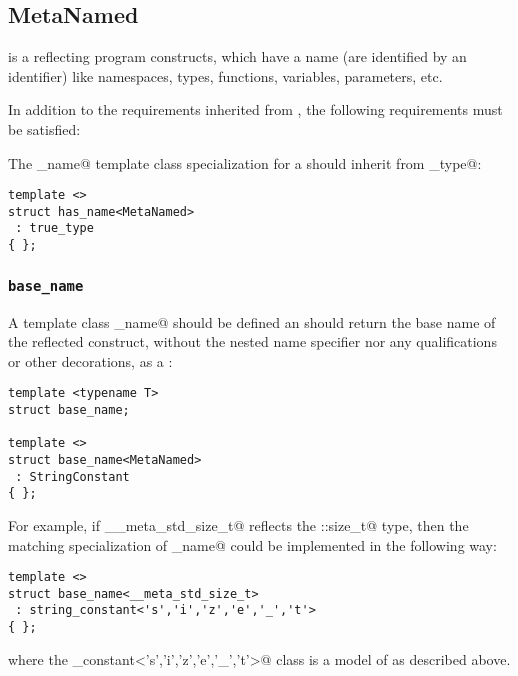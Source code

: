 \subsection{MetaNamed}
\label{concept-MetaNamed}


 is a  reflecting program constructs, which have a name
(are identified by an identifier) like namespaces, types, functions, variables, parameters, etc.

In addition to the requirements inherited from , the following requirements must
be satisfied:

The \verb@has_name@ template class specialization for a  should
inherit from \verb@true_type@:

\begin{verbatim}
template <>
struct has_name<MetaNamed>
 : true_type
{ };
\end{verbatim}

\subsubsection{\texttt{base\_name}}

A template class \verb@base_name@ should be defined an should return the base name
of the reflected construct, without the nested name specifier nor any qualifications
or other decorations, as a
:

\begin{verbatim}
template <typename T>
struct base_name;

template <>
struct base_name<MetaNamed>
 : StringConstant
{ };
\end{verbatim}

For example, if \verb@__meta_std_size_t@ reflects the \verb@std::size_t@ type,
then the matching specialization of \verb@base_name@ could be implemented in the following
way:

\begin{verbatim}
template <>
struct base_name<__meta_std_size_t>
 : string_constant<'s','i','z','e','_','t'>
{ };
\end{verbatim}

where the \verb@string_constant<'s','i','z','e','_','t'>@ class is a model
of  as described above.


